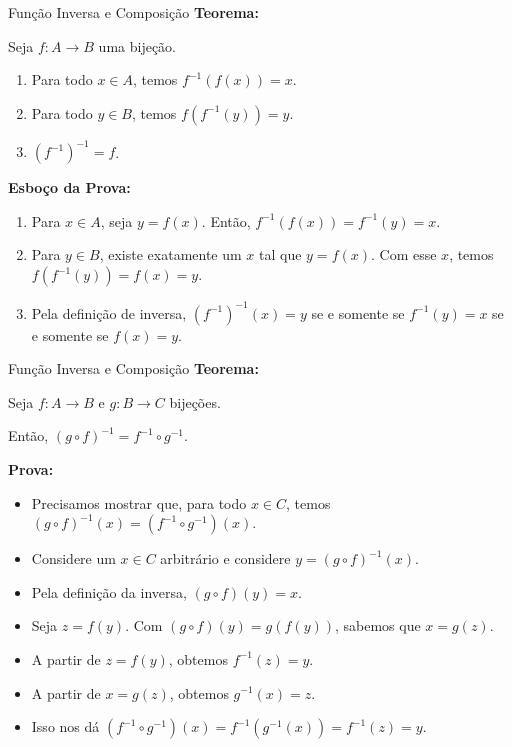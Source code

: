   \begin{frame}{Função Inversa e Composição}
    \textbf{Teorema:}
    
    Seja \(f : A \to B\) uma bijeção.
    
    \begin{enumerate}
      \item Para todo \(x \in A\), temos \(f^{-1}(f(x)) = x\).
      \item Para todo \(y \in B\), temos \(f(f^{-1}(y)) = y\).
      \item \((f^{-1})^{-1} = f\).
    \end{enumerate}
    
    \textbf{Esboço da Prova:}
    
    \begin{enumerate}
      \item Para \(x \in A\), seja \(y = f(x)\). Então, \(f^{-1}(f(x)) = f^{-1}(y) = x\).
      \item Para \(y \in B\), existe exatamente um \(x\) tal que \(y = f(x)\). Com esse \(x\), temos \(f(f^{-1}(y)) = f(x) = y\).
      \item Pela definição de inversa, \((f^{-1})^{-1}(x) = y\) se e somente se \(f^{-1}(y) = x\) se e somente se \(f(x) = y\).
    \end{enumerate}
  \end{frame}
  
  \begin{frame}{Função Inversa e Composição}
    \textbf{Teorema:}
    
    Seja \(f : A \to B\) e \(g : B \to C\) bijeções.
    
    Então, \((g \circ f)^{-1} = f^{-1} \circ g^{-1}\).
    
    \textbf{Prova:}
    \begin{itemize}
    \item Precisamos mostrar que, para todo \(x \in C\), temos \((g \circ f)^{-1}(x) = (f^{-1} \circ g^{-1})(x)\).
    
    \item Considere um \(x \in C\) arbitrário e considere \(y = (g \circ f)^{-1}(x)\).
    
    \item Pela definição da inversa, \((g \circ f)(y) = x\).
    
    \item Seja \(z = f(y)\). Com \((g \circ f)(y) = g(f(y))\), sabemos que \(x = g(z)\).
    
    \item A partir de \(z = f(y)\), obtemos \(f^{-1}(z) = y\).
    
    \item A partir de \(x = g(z)\), obtemos \(g^{-1}(x) = z\).
    
    \item Isso nos dá \((f^{-1} \circ g^{-1})(x) = f^{-1}(g^{-1}(x)) = f^{-1}(z) = y\).
    \end{itemize}

  \end{frame}
  
